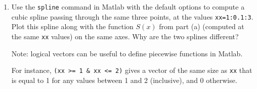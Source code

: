 \documentclass{article}
\begin{document}
\begin{enumerate}
\begin{enumerate}
\item  Use the {\tt spline} command in Matlab with the default options to compute a cubic spline passing through the same three points, at the values {\tt xx=1:0.1:3}. Plot this spline along with the function $S(x)$ from part (a) (computed at the same {\tt xx} values) on the same axes. Why are the two splines different?

Note: logical vectors can be useful to define piecewise functions in Matlab. 

For instance, {\tt (xx >= 1 \& xx <= 2)} gives a vector of the same size as {\tt xx} that is equal to 1 for any values between 1 and 2  (inclusive), and 0 otherwise. 
\end{enumerate}

\end{enumerate}
\end{document}
